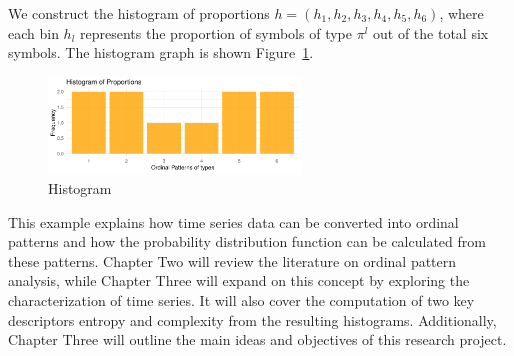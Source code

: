 We construct the histogram of proportions $h=(h_1,h_2,h_3,h_4,h_5,h_6)$, where each bin $h_l$ represents the proportion of symbols of type $\pi^l$ out of the total six symbols. The histogram graph is shown Figure~\ref{fig:histogram}.

\begin{figure}[hbt]
	\centering
	\includegraphics[width=0.6\textwidth]{frequency histogram}
	\caption{Histogram}
	\label{fig:histogram}
\end{figure}

This example explains how time series data can be converted into ordinal patterns and how the probability distribution function can be calculated from these patterns. Chapter Two will review the literature on ordinal pattern analysis, while Chapter Three will expand on this concept by exploring the characterization of time series. It will also cover the computation of two key descriptors entropy and complexity from the resulting histograms. Additionally, Chapter Three will outline the main ideas and objectives of this research project.      






